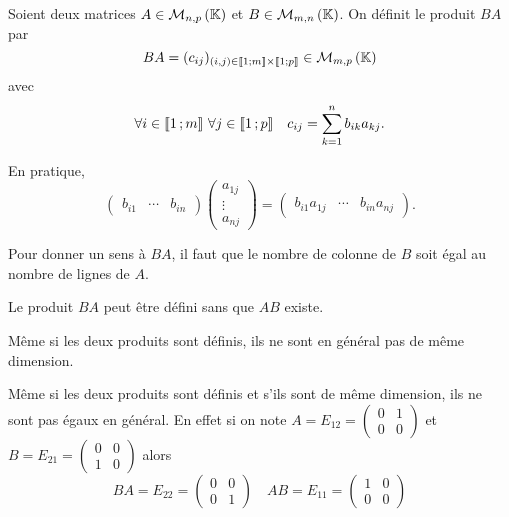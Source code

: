\begin{defdef}
  Soient deux matrices \(A \in \mathcal{M}_{n,p}\left(\mathbb{K}\right)\) et \(B \in \mathcal{M}_{m,n}\left(\mathbb{K}\right)\). On
  définit le produit \(BA\) par \begin{equation}
    BA=(c_{ij})_{(i,j)\in \mathopen{\llbracket}1\mathclose{}\mathpunct{};m\mathclose{\rrbracket} \times
    \mathopen{\llbracket}1\mathclose{}\mathpunct{};p\mathclose{\rrbracket}} \in \mathcal{M}_{m,p}\left(\mathbb{K}\right)
  \end{equation}
  avec
  \begin{equation}
    \forall i \in \mathopen{\llbracket}1\mathclose{}\mathpunct{};m\mathclose{\rrbracket} \ \forall j \in
    \mathopen{\llbracket}1\mathclose{}\mathpunct{};p\mathclose{\rrbracket} \quad c_{ij}=\sum_{k=1}^n b_{ik}a_{kj}.
  \end{equation}

  En pratique,
  \begin{equation}
    \begin{pmatrix} b_{i1} & \cdots & b_{in} \end{pmatrix} \begin{pmatrix}
      a_{1j} \\ \vdots \\ a_{nj} \end{pmatrix} = \begin{pmatrix} b_{i1}a_{1j} &
  \cdots & b_{in}a_{nj}\end{pmatrix}.
\end{equation}
\end{defdef}

\danger{} Pour donner un sens à \(BA\), il faut que le nombre de colonne de \(B\)
soit égal au nombre de lignes de \(A\).

\danger{} Le produit \(BA\) peut être défini sans que \(AB\) existe.

\danger{} Même si les deux produits sont définis, ils ne sont en général pas de
même dimension.

\danger{} Même si les deux produits sont définis et s'ils sont de même dimension,
ils ne sont pas égaux en général. En effet si on note \(A=E_{12}=\begin{pmatrix}
  0 & 1 \\ 0 & 0 \end{pmatrix}\) et \(B=E_{21}=\begin{pmatrix} 0 & 0 \\ 1 & 0
\end{pmatrix}\) alors
\begin{equation}
  BA = E_{22} = \begin{pmatrix} 0 & 0 \\ 0 & 1 \end{pmatrix} \quad AB = E_{11} =
    \begin{pmatrix} 1 & 0 \\ 0 & 0 \end{pmatrix}
\end{equation}


